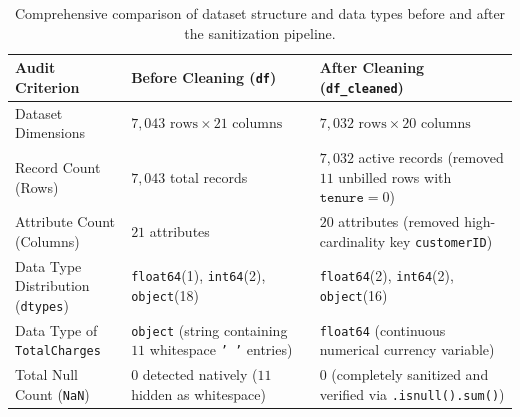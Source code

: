 \begin{table}[htbp]
\centering
\small
\begin{tabularx}{\textwidth}{l X X}
\toprule
\textbf{Audit Criterion} & \textbf{Before Cleaning (\texttt{df})} & \textbf{After Cleaning (\texttt{df\_cleaned})} \\
\midrule
Dataset Dimensions & $7,043\text{ rows} \times 21\text{ columns}$ & $7,032\text{ rows} \times 20\text{ columns}$ \\
\addlinespace
Record Count (Rows) & $7,043$ total records & $7,032$ active records (removed $11$ unbilled rows with $\texttt{tenure} = 0$) \\
\addlinespace
Attribute Count (Columns) & $21$ attributes & $20$ attributes (removed high-cardinality key \texttt{customerID}) \\
\addlinespace
Data Type Distribution (\texttt{dtypes}) & \texttt{float64}(1), \texttt{int64}(2), \texttt{object}(18) & \texttt{float64}(2), \texttt{int64}(2), \texttt{object}(16) \\
\addlinespace
Data Type of \texttt{TotalCharges} & \texttt{object} (string containing $11$ whitespace \texttt{' '} entries) & \texttt{float64} (continuous numerical currency variable) \\
\addlinespace
Total Null Count (\texttt{NaN}) & $0$ detected natively ($11$ hidden as whitespace) & $0$ (completely sanitized and verified via \texttt{.isnull().sum()}) \\
\bottomrule
\end{tabularx}
\caption{Comprehensive comparison of dataset structure and data types before and after the sanitization pipeline.}
\label{tab:cleaning_audit}
\end{table}

